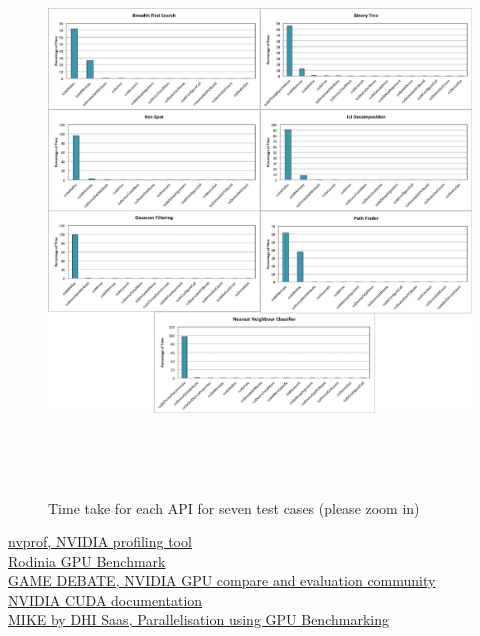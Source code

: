 \documentclass[paper=a4, fontsize=11pt]{scrartcl}
\numberwithin{equation}{section}		%
\numberwithin{figure}{section}			%
\numberwithin{table}{section}				%
\begin{document}
\begin{figure}[!h]
\centering
\includegraphics[width=1\textwidth,height=15cm]{../imgs/m6000.pdf}
\caption{Time take for each API for seven test cases (please zoom in)}
\label{fig:6000}
\end{figure}


\newpage
\clearpage
\begin{thebibliography}{5}

{\href{http://docs.nvidia.com/cuda/profiler-users-guide/#nvprof-overview}{nvprof, NVIDIA profiling tool} } \\

{\href{http://www.cs.virginia.edu/~skadron/wiki/rodinia/index.php/Rodinia:Accelerating_Compute-Intensive_Applications_with_Accelerators} {Rodinia GPU Benchmark}}\\

{\href{http://www.game-debate.com/gpu/index.php?gid=1658&gid2=1150&compare=geforce-gt-630-gainward-2gb-edition-vs-geforce-gtx-650-2gb}{GAME DEBATE, NVIDIA GPU compare and evaluation community}} \\

{\href{http://docs.nvidia.com/cuda/cuda-getting-started-guide-for-linux/#axzz4AXrC80gu}{NVIDIA CUDA documentation} }\\

{\href {http://docs.nvidia.com/cuda/cuda-getting-started-guide-for-linux/#axzz4AXrC80gu}{MIKE by DHI Saas, Parallelisation using GPU Benchmarking} } \\

\end{thebibliography}
\end{document}

